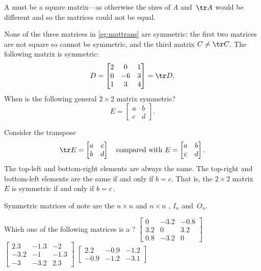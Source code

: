 A  must be a square matrix---as otherwise the sizes of \(A\) and~\(\tr A\) would be different and so the matrices could not be equal.


\begin{example} 
None of the three matrices in \cref{eg:mattrans} are symmetric: the first two matrices are not square so cannot be symmetric, and the third matrix \(C\neq\tr C\).  
The following matrix is symmetric:
\begin{equation*}
D=\begin{bmatrix} 2 & 0 & 1\\ 0 & -6 & 3\\ 1 & 3 & 4  \end{bmatrix}
=\tr D.
\end{equation*}
When is the following general \(2\times2\) matrix symmetric?
\begin{equation*}
E=\begin{bmatrix} a&b\\c&d \end{bmatrix}.
\end{equation*}
\begin{solution} 
Consider the transpose
\begin{equation*}
\tr E=\begin{bmatrix} a&c\\b&d \end{bmatrix}
\quad\text{compared with }
E=\begin{bmatrix} a&b\\c&d \end{bmatrix}.
\end{equation*}
The top-left and bottom-right elements are always the same.
The top-right and bottom-left elements are the same if and only if \(b=c\).
That is, the \(2\times 2\) matrix~\(E\) is symmetric if and only if \(b=c\)\,.
\end{solution}
\end{example}

Symmetric matrices of note are the \(n\times n\)  and \(n\times n\) , \(I_n\) and~\(O_n\).


\begin{activity}
Which one of the following matrices is a ?
{\(\begin{bmatrix} 0&-3.2&-0.8
\\3.2&0&3.2
\\0.8&-3.2&0 \end{bmatrix}\)}
{\(\begin{bmatrix} 2.3&-1.3&-2
\\-3.2&-1&-1.3
\\-3&-3.2&2.3 \end{bmatrix}\)}
{\(\begin{bmatrix} 2.2&-0.9&-1.2
\\-0.9&-1.2&-3.1 \end{bmatrix}\)}
\end{activity}
   


